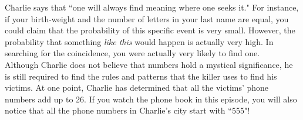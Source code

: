 Charlie says that ``one will always find meaning where one seeks it." For instance, if your birth-weight and the number of letters in your last name are equal, you could claim that the probability of this specific event is very small. However, the probability that something \emph{like this} would happen is actually very high. In searching for the coincidence, you were actually very likely to find one. \\

Although Charlie does not believe that numbers hold a mystical significance, he is still required to find the rules and patterns that the killer uses to find his victims. At one point, Charlie has determined that all the victims' phone numbers add up to 26. If you watch the phone book in this episode, you will also notice that all the phone numbers in Charlie's city start with ``555"! \\

